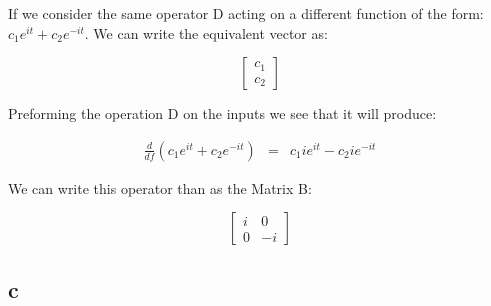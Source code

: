 \documentclass[12pt]{article}
\begin{document}
If we consider the same operator D acting on a different function of the form: $c_{1}e^{it} + c_{2}e^{-it}$. We can write the equivalent vector as:

\[
\begin{bmatrix}
c_{1}\\
c_{2}
\end{bmatrix}
\]

Preforming the operation D on the inputs we see that it will produce:

\begin{eqnarray*}
\frac{d}{df}(c_{1}e^{it} + c_{2}e^{-it}) &=& c_{1}ie^{it} - c_{2}ie^{-it}
\end{eqnarray*}

We can write this operator than as the Matrix B:

\[
\begin{bmatrix}
i & 0\\
0 & -i
\end{bmatrix}
\]

\subsection*{c}
\end{document}
